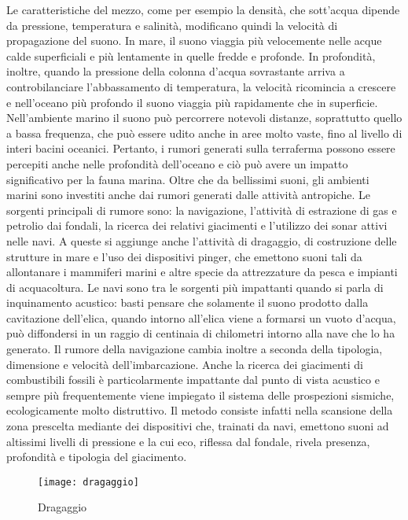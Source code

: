 Le caratteristiche del mezzo, come per esempio la densità, che sott’acqua dipende da pressione, temperatura e salinità, modificano quindi la velocità di propagazione del suono.
In mare, il suono viaggia più velocemente nelle acque calde superficiali e più lentamente in quelle fredde e profonde. 
In profondità, inoltre, quando la pressione della colonna d’acqua sovrastante arriva a controbilanciare l’abbassamento di temperatura, la velocità ricomincia a crescere e nell’oceano più profondo il suono viaggia più rapidamente che in superficie. 
Nell’ambiente marino il suono può percorrere notevoli distanze, soprattutto quello a bassa frequenza, che può essere udito anche in aree molto vaste, fino al livello di interi bacini oceanici. Pertanto, i rumori generati sulla terraferma possono essere percepiti anche nelle profondità dell’oceano e ciò può avere un impatto significativo per la fauna marina.
Oltre che da bellissimi suoni, gli ambienti marini sono investiti anche dai rumori generati dalle attività antropiche. 
Le sorgenti principali di rumore sono: la navigazione, l’attività di estrazione di gas e petrolio dai fondali, la ricerca dei relativi giacimenti e l’utilizzo dei sonar attivi nelle navi. 
A queste si aggiunge anche l’attività di dragaggio, di costruzione delle strutture in mare e l’uso dei dispositivi pinger, che emettono suoni tali da allontanare i mammiferi marini e altre specie da attrezzature da pesca e impianti di acquacoltura.
Le navi sono tra le sorgenti più impattanti quando si parla di inquinamento acustico: 
basti pensare che solamente il suono prodotto dalla cavitazione dell’elica, quando intorno all’elica viene a formarsi un vuoto d’acqua, può diffondersi in un raggio di centinaia di chilometri intorno alla nave che lo ha generato. 
Il rumore della navigazione cambia inoltre a seconda della tipologia, dimensione e velocità dell’imbarcazione.
Anche la ricerca dei giacimenti di combustibili fossili è particolarmente impattante dal punto di vista acustico e sempre più frequentemente viene impiegato il sistema delle prospezioni sismiche, ecologicamente molto distruttivo. 
Il metodo consiste infatti nella scansione della zona prescelta mediante dei dispositivi che, trainati da navi, emettono suoni ad altissimi livelli di pressione e la cui eco, riflessa dal fondale, rivela presenza, profondità e tipologia del giacimento.

\begin{figure}[h]
\centering
\texttt{[image: dragaggio]}
\caption{Dragaggio}
\end{figure} 

